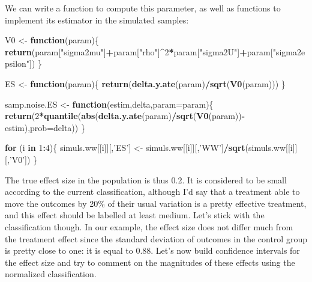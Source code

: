 \documentclass[]{book}
\newenvironment{Shaded}{\begin{snugshade}}{\end{snugshade}}
\newcommand{\ControlFlowTok}[1]{\textcolor[rgb]{0.13,0.29,0.53}{\textbf{#1}}}
\newcommand{\DataTypeTok}[1]{\textcolor[rgb]{0.13,0.29,0.53}{#1}}
\newcommand{\DecValTok}[1]{\textcolor[rgb]{0.00,0.00,0.81}{#1}}
\newcommand{\KeywordTok}[1]{\textcolor[rgb]{0.13,0.29,0.53}{\textbf{#1}}}
\newcommand{\NormalTok}[1]{#1}
\newcommand{\OperatorTok}[1]{\textcolor[rgb]{0.81,0.36,0.00}{\textbf{#1}}}
\newcommand{\StringTok}[1]{\textcolor[rgb]{0.31,0.60,0.02}{#1}}
\theoremstyle{definition}
\theoremstyle{definition}
\theoremstyle{definition}
\theoremstyle{remark}
\begin{document}
We can write a function to compute this parameter, as well as functions to implement its estimator in the simulated samples:

\begin{Shaded}
\begin{Highlighting}[]
\NormalTok{V0 <-}\StringTok{ }\ControlFlowTok{function}\NormalTok{(param)\{}
  \KeywordTok{return}\NormalTok{(param[}\StringTok{"sigma2mu"}\NormalTok{]}\OperatorTok{+}\NormalTok{param[}\StringTok{"rho"}\NormalTok{]}\OperatorTok{^}\DecValTok{2}\OperatorTok{*}\NormalTok{param[}\StringTok{"sigma2U"}\NormalTok{]}\OperatorTok{+}\NormalTok{param[}\StringTok{"sigma2epsilon"}\NormalTok{])}
\NormalTok{\}}

\NormalTok{ES <-}\StringTok{ }\ControlFlowTok{function}\NormalTok{(param)\{}
  \KeywordTok{return}\NormalTok{(}\KeywordTok{delta.y.ate}\NormalTok{(param)}\OperatorTok{/}\KeywordTok{sqrt}\NormalTok{(}\KeywordTok{V0}\NormalTok{(param)))}
\NormalTok{\}}

\NormalTok{samp.noise.ES <-}\StringTok{ }\ControlFlowTok{function}\NormalTok{(estim,delta,}\DataTypeTok{param=}\NormalTok{param)\{}
  \KeywordTok{return}\NormalTok{(}\DecValTok{2}\OperatorTok{*}\KeywordTok{quantile}\NormalTok{(}\KeywordTok{abs}\NormalTok{(}\KeywordTok{delta.y.ate}\NormalTok{(param)}\OperatorTok{/}\KeywordTok{sqrt}\NormalTok{(}\KeywordTok{V0}\NormalTok{(param))}\OperatorTok{-}\NormalTok{estim),}\DataTypeTok{prob=}\NormalTok{delta))}
\NormalTok{\}}

\ControlFlowTok{for}\NormalTok{ (i }\ControlFlowTok{in} \DecValTok{1}\OperatorTok{:}\DecValTok{4}\NormalTok{)\{}
\NormalTok{  simuls.ww[[i]][,}\StringTok{'ES'}\NormalTok{] <-}\StringTok{ }\NormalTok{simuls.ww[[i]][,}\StringTok{'WW'}\NormalTok{]}\OperatorTok{/}\KeywordTok{sqrt}\NormalTok{(simuls.ww[[i]][,}\StringTok{'V0'}\NormalTok{])}
\NormalTok{\}}
\end{Highlighting}
\end{Shaded}

The true effect size in the population is thus 0.2.
It is considered to be small according to the current classification, although I'd say that a treatment able to move the outcomes by 20\% of their usual variation is a pretty effective treatment, and this effect should be labelled at least medium.
Let's stick with the classification though.
In our example, the effect size does not differ much from the treatment effect since the standard deviation of outcomes in the control group is pretty close to one: it is equal to 0.88.
Let's now build confidence intervals for the effect size and try to comment on the magnitudes of these effects using the normalized classification.
\end{document}
